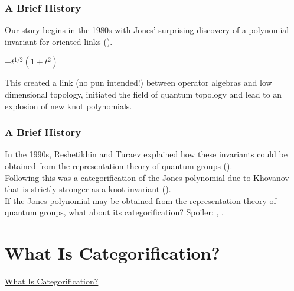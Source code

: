 \documentclass{beamer}
\begin{document}
\begin{frame}
\frametitle{A Brief History}
Our story begins in the 1980s with Jones' surprising discovery of a polynomial invariant for oriented links (\textcolor{structure}{\cite{Jon85}}).
\begin{center}
\quad{\Large $\rightsquigarrow$}\quad $-t^{1/2}(1 + t^2)$
\end{center}
This created a link (no pun intended!) between operator algebras and low dimensional topology, initiated the field of quantum topology and lead to an explosion of new knot polynomials. 
\end{frame}

\begin{frame}
\frametitle{A Brief History}
In the 1990s, Reshetikhin and Turaev explained how these invariants could be obtained from the representation theory of quantum groups (\textcolor{structure}{\cite{RT91}}).\\[2ex]
Following this was a categorification of the Jones polynomial due to Khovanov that is strictly stronger as a knot invariant (\textcolor{structure}{\cite{Kho00}}).\\[2ex]
If the Jones polynomial may be obtained from the representation theory of quantum groups, what about its categorification? Spoiler: \textcolor{structure}{\cite{Web13a}}, \textcolor{structure}{\cite{Web13b}}.
\end{frame}


\section{What Is Categorification?}

\begin{frame}
\centerline{\huge\textcolor{structure}{\underline{What Is Categorification?}}}
\end{frame}
\end{document}
